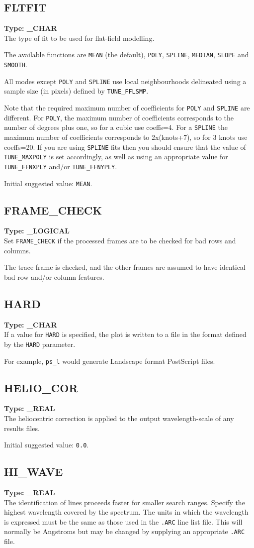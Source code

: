 \documentclass[11pt,twoside]{article}
\makeatletter
\newcommand{\stardocinitials}  {SUN}
\newcommand{\stardocnumber}    {152.4}
\newcommand{\stardocname}{\stardocinitials /\stardocnumber}
\newcommand{\htmlref}[2]{#1}
\newcommand{\xlabel}[1]{}
\newcommand{\sunspec}[2]{#1}
\renewcommand{\sunspec}[2]{#2}
\newcommand{\indexcmdname}[1]{\index{#1@\protect\cmdname{#1}}}
\renewcommand{\indexcmdname}[1]{}
\newcommand{\cmdname}{\begingroup \catcode`\_=12 \realcmdname}
\newcommand{\realcmdname}[1]{\endgroup\texttt{#1}}
\newcommand{\echparameter}[4]
{
\item [#1 = #3] \mbox{}\label{par_#2}\indexcmdname{#2}
\\
#4
}
\renewcommand{\echparameter}[4]
{
  \subsection{\xlabel{par_#2}\label{par_#2}{\bf #1}}
  {\bf Type: #3}\\
#4
}
\makeatother
\begin{document}
\echparameter{FLTFIT}{FLTFIT}{
 \_CHAR
}{
 The type of fit to be used for flat-field modelling.

 The available functions are \texttt{MEAN} (the default), \texttt{POLY},
 \texttt{SPLINE}, \texttt{MEDIAN}, \texttt{SLOPE} and \texttt{SMOOTH}.

 All modes except \texttt{POLY} and \texttt{SPLINE} use local neighbourhoods
 delineated using a sample size (in pixels) defined by
 \htmlref{{\tt TUNE\_FFLSMP}}{par_TUNE_FFLSMP}.

 Note that the required maximum number of coefficients for \texttt{POLY} and
 \texttt{SPLINE} are different.  For \texttt{POLY}, the maximum number of
 coefficients corresponds to the number of degrees plus one, so for a cubic use
 coeffs=4.  For a \texttt{SPLINE} the maximum number of coefficients corresponds
 to \sunspec{(knots+7)$\times$2}{2x(knots+7)}, so for 3 knots use coeffs=20.
 If you are using \texttt{SPLINE}
 fits then you should ensure that the value of
 \htmlref{{\tt TUNE\_MAXPOLY}}{par_TUNE_MAXPOLY} is set
 accordingly, as well as using an appropriate value for
 \htmlref{{\tt TUNE\_FFNXPLY}}{par_TUNE_FFNXPLY}
 and/or \htmlref{{\tt TUNE\_FFNYPLY}}{par_TUNE_FFNYPLY}.

 Initial suggested value: \texttt{MEAN}.
}

\echparameter{FRAME\_CHECK}{FRAME_CHECK}{
 \_LOGICAL
}{
 Set {\tt FRAME\_CHECK} if the processed frames are to be checked for
 bad rows and columns.

 The trace frame is checked, and the other frames are assumed to have
 identical bad row and/or column features.
}

\markboth{PARAMETERS: H}{\stardocname}
\echparameter{HARD}{HARD}{
 \_CHAR
}{
 If a value for {\tt HARD} is specified, the plot is written to a file
 in the format defined by the {\tt HARD} parameter.

 For example, {\tt ps\_l} would generate Landscape format PostScript files.
}

\echparameter{HELIO\_COR}{HELIO_COR}{
 \_REAL
}{
 The heliocentric correction is applied to the output
 wavelength-scale of any results files.

 Initial suggested value: \texttt{0.0}.
}

\echparameter{HI\_WAVE}{HI_WAVE}{
 \_REAL
}{
 The identification of lines proceeds faster for smaller search
 ranges.  Specify the highest wavelength covered by the spectrum.
 The units in which the wavelength is expressed must be the same as
 those used in the \texttt{.ARC} line list file.  This will normally be
 Angstroms but may be changed by supplying an appropriate \texttt{.ARC} file.
}
\end{document}
